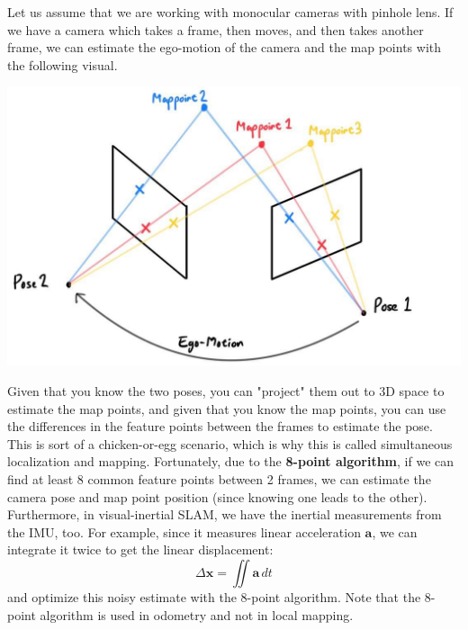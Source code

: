 \documentclass{article}
\theoremstyle{definition}
\theoremstyle{remark}
\theoremstyle{definition}
\begin{document}
Let us assume that we are working with monocular cameras with pinhole lens. If we have a camera which takes a frame, then moves, and then takes another frame, we can estimate the ego-motion of the camera and the map points with the following visual. 
\begin{center}
    \includegraphics[scale=0.23]{img/visual_odometry.jpg}
\end{center}
Given that you know the two poses, you can "project" them out to 3D space to estimate the map points, and given that you know the map points, you can use the differences in the feature points between the frames to estimate the pose. This is sort of a chicken-or-egg scenario, which is why this is called simultaneous localization and mapping. Fortunately, due to the \textbf{8-point algorithm}, if we can find at least 8 common feature points between 2 frames, we can estimate the camera pose and map point position (since knowing one leads to the other). Furthermore, in visual-inertial SLAM, we have the inertial measurements from the IMU, too. For example, since it measures linear acceleration $\mathbf{a}$, we can integrate it twice to get the linear displacement: 
\[\Delta \mathbf{x} = \iint \mathbf{a}\,dt\]
and optimize this noisy estimate with the 8-point algorithm. Note that the 8-point algorithm is used in odometry and not in local mapping. 
\end{document}
